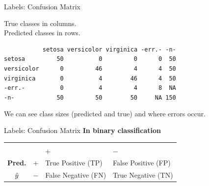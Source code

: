 \begin{vbframe}{Labels: Confusion Matrix}

True classes in columns.\\
Predicted classes in rows.\\

\lz

\begin{knitrout}\scriptsize
{}\color{fgcolor}\begin{kframe}
\begin{verbatim}
           setosa versicolor virginica -err.- -n-
setosa         50          0         0      0  50
versicolor      0         46         4      4  50
virginica       0          4        46      4  50
-err.-          0          4         4      8  NA
-n-            50         50        50     NA 150
\end{verbatim}
\end{kframe}
\end{knitrout}

\lz
We can see class sizes (predicted and true) and where errors occur.
\end{vbframe}



\begin{vbframe}{Labels: Confusion Matrix}
\textbf{In binary classification}

\begin{center}
\small
\begin{tabular}{cc|>{\centering\arraybackslash}p{7em}>{\centering\arraybackslash}p{8em}}
    & & \multicolumn{2}{c}{\bfseries True Class $y$} \\
    & & $+$ & $-$ \\
    \hline
    \bfseries Pred.     & $+$ & True Positive (TP)  & False Positive (FP) \\
              $\hat{y}$ & $-$ & False Negative (FN) & True Negative (TN) \\
\end{tabular}
\end{center}

\end{vbframe}




